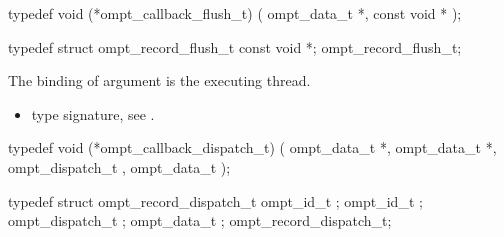 \label{sec:ompt_callback_flush_t}
\format

\begin{ccppspecific}
\begin{omptCallback}
typedef void (*ompt_callback_flush_t) (
  ompt_data_t *,
  const void *
);
\end{omptCallback}
\end{ccppspecific}


\record

\begin{ccppspecific}
\begin{omptRecord}
typedef struct ompt_record_flush_t {
  const void *;
} ompt_record_flush_t;
\end{omptRecord}
\end{ccppspecific}


\argdesc

The binding of argument  is the executing thread.

\codeptrdesc

\crossreferences
\begin{itemize}
\item {} type signature, see
.
\end{itemize}



\label{sec:ompt_callback_dispatch_t}
\format

\begin{ccppspecific}
\begin{omptCallback}
typedef void (*ompt_callback_dispatch_t) (
  ompt_data_t *,
  ompt_data_t *,
  ompt_dispatch_t ,
  ompt_data_t  
);
\end{omptCallback}
\end{ccppspecific}


\record

\begin{ccppspecific}
\begin{omptRecord}
typedef struct ompt_record_dispatch_t {
  ompt_id_t ;
  ompt_id_t ;
  ompt_dispatch_t ;
  ompt_data_t ; 
} ompt_record_dispatch_t;
\end{omptRecord}
\end{ccppspecific}


